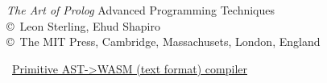 \begin{thebibliography}{9}

\emph{The Art of Prolog} Advanced Programming Techniques\\
\copyright\ Leon Sterling, Ehud Shapiro\\
\copyright\ The MIT Press, Cambridge, Massachusets, London, England

\ \href{https://gist.github.com/gabriel-fallen/5027a387ca75f595c03404c31d76ce86}{Primitive AST->WASM (text format) compiler}

\end{thebibliography}
